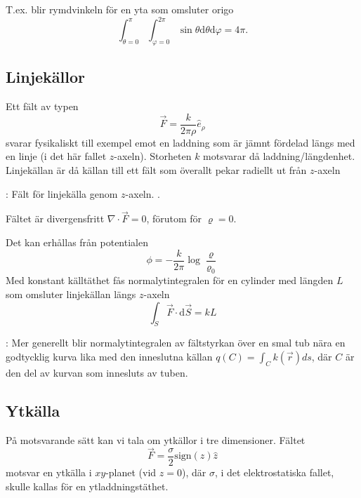 \documentclass[%
oneside,                 %
final,                   %
10pt]{article}
\newcommand{\shortinlinecomment}[3]{{\color{red}{\bf #1}: #2}}
\newcommand{\longinlinecomment}[3]{{\color{red}{\bf #1}: #2}}
\begin{document}
T.ex. blir rymdvinkeln för en yta som omsluter origo
\begin{equation}
\int_{\theta=0}^\pi \int_{\varphi=0}^{2\pi} \sin\theta \mbox{d}\theta \mbox{d}\varphi = 4\pi.
\end{equation}

\subsection{Linjekällor}

Ett fält av typen
\begin{equation}
  \vec{F} = \frac{k}{2 \pi \rho} \hat{e}_{\rho}
\end{equation}
svarar fysikaliskt till exempel emot en laddning som är jämnt fördelad längs med en linje (i det här fallet $z$-axeln). Storheten $k$ motsvarar då laddning/längdenhet. Linjekällan är då källan till ett fält som överallt pekar radiellt ut från $z$-axeln 

\shortinlinecomment{Rita 4}{ Fält för linjekälla genom $z$-axeln. }{ Fält för linjekälla genom }.

Fältet är divergensfritt $\nabla \cdot \vec{F} = 0$, förutom för $\varrho=0$.

Det kan erhållas från potentialen 
\begin{equation}
	\phi=-\frac{k}{2\pi}\log\frac{\varrho}{\varrho_0}
\end{equation}
Med konstant källtäthet fås normalytintegralen för en cylinder med längden $L$ som omsluter linjekällan längs $z$-axeln
\begin{equation}
	\int_S \vec{F} \cdot \mbox{d}\vec{S} = k L
\end{equation}

\longinlinecomment{Comment 5}{ Mer generellt blir normalytintegralen av fältstyrkan över en smal tub nära en godtycklig kurva lika med den inneslutna källan $q(C)=\int_C k(\vec{r}) ds$, där $C$ är den del av kurvan som innesluts av tuben. }{ Mer generellt blir normalytintegralen }

\subsection{Ytkälla}

På motsvarande sätt kan vi tala om ytkällor i tre dimensioner. Fältet 
\begin{equation} 
\vec F=\frac{\sigma}{2}\mathrm{sign}(z)\hat{z}
\end{equation}
motsvar en ytkälla i $xy$-planet (vid $z=0$), där $\sigma$, i det elektrostatiska fallet, skulle kallas för en ytladdningstäthet.
\end{document}

